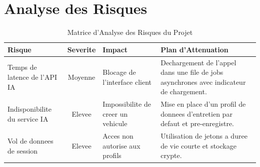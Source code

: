 \documentclass[11pt,a4paper]{report}
\begin{document}
\section{Analyse des Risques}
\begin{table}[h!]
\centering
\caption{Matrice d'Analyse des Risques du Projet}
\label{tab:risques}
\vspace{0.2cm}
\begin{tabular}{@{}p{3.5cm} c p{4cm} p{6cm}@{}}
\toprule
\textbf{Risque} & \textbf{Severite} & \textbf{Impact} & \textbf{Plan d'Attenuation} \\ \midrule
Temps de latence de l'API IA & Moyenne & Blocage de l'interface client & Dechargement de l'appel dans une file de jobs asynchrones avec indicateur de chargement. \\
Indisponibilite du service IA & Elevee & Impossibilite de creer un vehicule & Mise en place d'un profil de donnees d'entretien par defaut et pre-enregistre. \\
Vol de donnees de session & Elevee & Acces non autorise aux profils & Utilisation de jetons a duree de vie courte et stockage crypte. \\
\bottomrule
\end{tabular}
\end{table}
\end{document}
